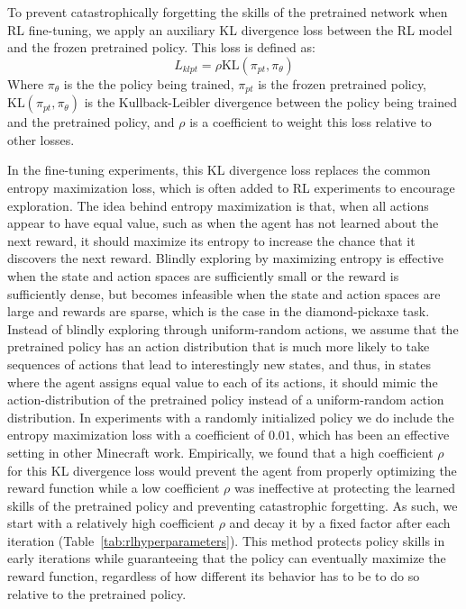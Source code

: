 To prevent catastrophically forgetting the skills of the pretrained network when RL fine-tuning, we apply an auxiliary KL divergence loss between the RL model and the frozen pretrained policy.\cite{vinyals2019grandmaster}
This loss is defined as:
\begin{equation}
    L_{klpt} = \rho \mathrm{KL}(\pi_{pt}, \pi_\theta)
\end{equation}
Where $\pi_\theta$ is the the policy being trained, $\pi_{pt}$ is the frozen pretrained policy, $\mathrm{KL}(\pi_{pt}, \pi_\theta)$ is the Kullback-Leibler divergence between the policy being trained and the pretrained policy, and $\rho$ is a coefficient to weight this loss relative to other losses.

In the fine-tuning experiments, this KL divergence loss replaces the common entropy maximization loss, which is often added to RL experiments to encourage exploration.\cite{williams1992simple, mnih2016asynchronous}
The idea behind entropy maximization is that, when all actions appear to have equal value, such as when the agent has not learned about the next reward, it should maximize its entropy to increase the chance that it discovers the next reward.
Blindly exploring by maximizing entropy is effective when the state and action spaces are sufficiently small or the reward is sufficiently dense, but becomes infeasible when the state and action spaces are large and rewards are sparse, which is the case in the diamond-pickaxe task.
Instead of blindly exploring through uniform-random actions, we assume that the pretrained policy has an action distribution that is much more likely to take sequences of actions that lead to interestingly new states, and thus, in states where the agent assigns equal value to each of its actions, it should mimic the action-distribution of the pretrained policy instead of a uniform-random action distribution.
In experiments with a randomly initialized policy we do include the entropy maximization loss with a coefficient of $0.01$, which has been an effective setting in other Minecraft work.\cite{kanitscheider2021multi}
Empirically, we found that a high coefficient $\rho$ for this KL divergence loss would prevent the agent from properly optimizing the reward function while a low coefficient $\rho$ was ineffective at protecting the learned skills of the pretrained policy and preventing catastrophic forgetting.
As such, we start with a relatively high coefficient $\rho$ and decay it %
by a fixed factor after each iteration (Table~\ref{tab:rlhyperparameters}).
This method protects policy skills in early iterations while guaranteeing that the policy can eventually maximize the reward function, regardless of how different its behavior has to be to do so relative to the pretrained policy.

